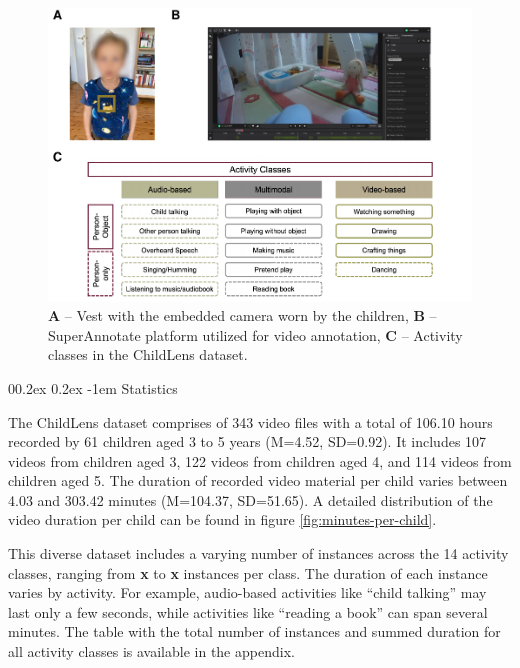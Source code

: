 \documentclass[
  man,floatsintext]{apa6}
\makeatletter
\let\oldparagraph\paragraph
\renewcommand{\paragraph}{
    \@ifstar
      \xxxParagraphStar
      \xxxParagraphNoStar
  }
\newcommand{\xxxParagraphStar}[1]{\oldparagraph*{#1}\mbox{}}
\newcommand{\xxxParagraphNoStar}[1]{\oldparagraph{#1}\mbox{}}
\renewcommand{\paragraph}{\@startsection{paragraph}{4}{\parindent}%
  {0\baselineskip \@plus 0.2ex \@minus 0.2ex}%
  {-1em}%
  {\normalfont\normalsize\bfseries\itshape\typesectitle}}
\makeatother
\begin{document}
\begin{figure}

{\centering \includegraphics{ChildLens_paper_files/figure-latex/camera-superannotate-activity-classes-1} 

}

\caption{\textbf{A} – Vest with the embedded camera worn by the children, \textbf{B} – SuperAnnotate platform utilized for video annotation, \textbf{C} – Activity classes in the ChildLens dataset.}\label{fig:camera-superannotate-activity-classes}
\end{figure}

\paragraph{Statistics}\label{statistics}

The ChildLens dataset comprises of 343 video files with a total of 106.10 hours recorded by 61 children aged 3 to 5 years (M=4.52, SD=0.92). It includes 107 videos from children aged 3, 122 videos from children aged 4, and 114 videos from children aged 5. The duration of recorded video material per child varies between 4.03 and 303.42 minutes (M=104.37, SD=51.65). A detailed distribution of the video duration per child can be found in figure \ref{fig:minutes-per-child}.

This diverse dataset includes a varying number of instances across the 14 activity classes, ranging from \textbf{x} to \textbf{x} instances per class. The duration of each instance varies by activity. For example, audio-based activities like ``child talking'' may last only a few seconds, while activities like ``reading a book'' can span several minutes. The table with the total number of instances and summed duration for all activity classes is available in the appendix.
\end{document}
